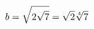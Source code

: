 \documentclass[preview]{standalone}
\begin{document}
\begin{align*}
\special{dvisvgm:raw <g id='unique000'>}b=\sqrt{2\sqrt{7}}=\sqrt{2}\sqrt[4]{7}\special{dvisvgm:raw </g>}
\end{align*}
\end{document}
